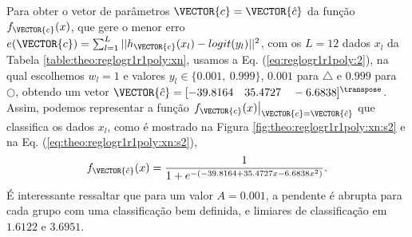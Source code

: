 \begin{SolutionT}\label{sol:theo:reglogr1r1poly:s2}
Para obter o vetor de parâmetros $\VECTOR{c}=\VECTOR{\hat{c}}$ da função $f_{\VECTOR{c}}(x)$, 
que gere o menor erro $e(\VECTOR{c}) =   \sum_{l=1}^{L} ||h_{\VECTOR{c}}(x_l)-logit(y_l)||^2$,
com os $L=12$ dados $x_l$ da Tabela \ref{table:theo:reglogr1r1poly:xn},
usamos a Eq. (\ref{eq:reglogr1r1poly:2}), na qual escolhemos $w_l=1$ e valores $y_l \in \{0.001,~ 0.999\}$,
$0.001$ para $\bigtriangleup$ e $0.999$ para $\bigcirc$,
obtendo um vetor $\VECTOR{\hat{c}}=[-39.8164\quad 35.4727\quad -6.6838]^{\transpose}$. 
Assim, podemos representar a função $\left.f_{\VECTOR{c}}(x)\right|_{\VECTOR{c}=\VECTOR{\hat{c}}}$ 
que classifica os dados $x_l$, 
como é mostrado na Figura \ref{fig:theo:reglogr1r1poly:xn:s2} e na Eq. (\ref{eq:theo:reglogr1r1poly:xn:s2}),
\begin{equation}\label{eq:theo:reglogr1r1poly:xn:s2}
f_{\VECTOR{\hat{c}}}(x)= \frac{1}{1+e^{-(-39.8164+35.4727 x -6.6838 x^2)}}.
\end{equation}
É interessante ressaltar que para um valor $A=0.001$, 
a pendente é abrupta para cada grupo com uma classificação bem definida,
e limiares de classificação em $1.6122$ e $3.6951$.
\end{SolutionT}
